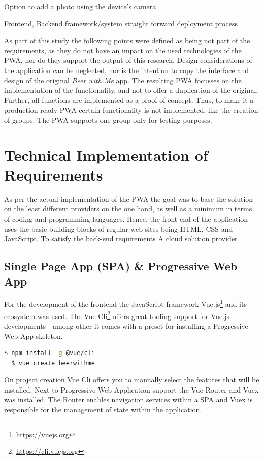 Option to add a photo using the device’s camera


Frontend, Backend framework/system
straight forward deployment process

As part of this study the following points were defined as being not part of the requirements, as they do not have an impact on the used technologies of the PWA, nor do they support the output of this research. Design considerations of the application can be neglected, nor is the intention to copy the interface and design of the original \textit{Beer with Me} app. The resulting PWA focusses on the implementation of the functionality, and not to offer a duplication of the original. Further, all functions are implemented as a proof-of-concept. Thus, to make it a production ready PWA certain functionality is not implemented, like the creation of groups. The PWA supports one group only for testing purposes.


\section{Technical Implementation of Requirements}
As per the actual implementation of the PWA the goal was to base the solution on the least different providers on the one hand, as well as a minimum in terms of coding and programming languages. Hence, the front-end of the application uses the basic building blocks of regular web sites being HTML, CSS and JavaScript. To satisfy the back-end requirements A cloud solution provider

\subsection{Single Page App (SPA) \& Progressive Web App}
For the development of the frontend the JavaScript framework Vue.js\footnote{\url{https://vuejs.org}} and its ecosystem was used. The Vue Cli\footnote{\url{https://cli.vuejs.org}} offers great tooling support for Vue.js developments - among other it comes with a preset for installing a Progressive Web App skeleton.

\begin{lstlisting}[language=bash, caption=Installation and project creation commands with the Vue Cli, label=lst:vue-cli]
  $ npm install -g @vue/cli
  $ vue create beerwithme
\end{lstlisting}

On project creation Vue Cli offers you to manually select the features that will be installed. Next to Progressive Web Application support the Vue Router and Vuex was installed. The Router enables navigation services within a SPA and Vuex is responsible for the management of state within the application.


